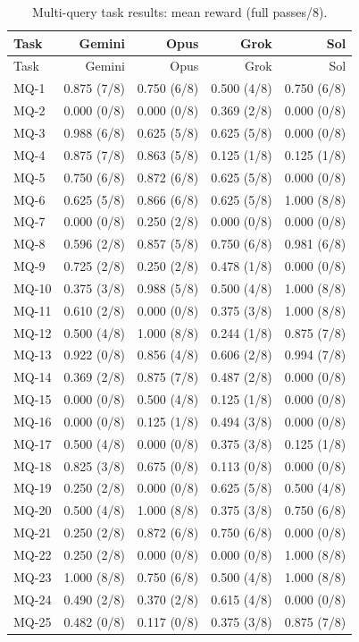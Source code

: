 \documentclass[11pt,letterpaper]{article}
\begin{document}
\clearpage
\begin{longtable}{@{}lrrrr@{}}
\caption{Multi-query task results: mean reward (full passes/8).}\\
\toprule Task & Gemini & Opus & Grok & Sol\\\midrule\endfirsthead
\toprule Task & Gemini & Opus & Grok & Sol\\\midrule\endhead
MQ-1 & 0.875 (7/8) & 0.750 (6/8) & 0.500 (4/8) & 0.750 (6/8)\\
MQ-2 & 0.000 (0/8) & 0.000 (0/8) & 0.369 (2/8) & 0.000 (0/8)\\
MQ-3 & 0.988 (6/8) & 0.625 (5/8) & 0.625 (5/8) & 0.000 (0/8)\\
MQ-4 & 0.875 (7/8) & 0.863 (5/8) & 0.125 (1/8) & 0.125 (1/8)\\
MQ-5 & 0.750 (6/8) & 0.872 (6/8) & 0.625 (5/8) & 0.000 (0/8)\\
MQ-6 & 0.625 (5/8) & 0.866 (6/8) & 0.625 (5/8) & 1.000 (8/8)\\
MQ-7 & 0.000 (0/8) & 0.250 (2/8) & 0.000 (0/8) & 0.000 (0/8)\\
MQ-8 & 0.596 (2/8) & 0.857 (5/8) & 0.750 (6/8) & 0.981 (6/8)\\
MQ-9 & 0.725 (2/8) & 0.250 (2/8) & 0.478 (1/8) & 0.000 (0/8)\\
MQ-10 & 0.375 (3/8) & 0.988 (5/8) & 0.500 (4/8) & 1.000 (8/8)\\
MQ-11 & 0.610 (2/8) & 0.000 (0/8) & 0.375 (3/8) & 1.000 (8/8)\\
MQ-12 & 0.500 (4/8) & 1.000 (8/8) & 0.244 (1/8) & 0.875 (7/8)\\
MQ-13 & 0.922 (0/8) & 0.856 (4/8) & 0.606 (2/8) & 0.994 (7/8)\\
MQ-14 & 0.369 (2/8) & 0.875 (7/8) & 0.487 (2/8) & 0.000 (0/8)\\
MQ-15 & 0.000 (0/8) & 0.500 (4/8) & 0.125 (1/8) & 0.000 (0/8)\\
MQ-16 & 0.000 (0/8) & 0.125 (1/8) & 0.494 (3/8) & 0.000 (0/8)\\
MQ-17 & 0.500 (4/8) & 0.000 (0/8) & 0.375 (3/8) & 0.125 (1/8)\\
MQ-18 & 0.825 (3/8) & 0.675 (0/8) & 0.113 (0/8) & 0.000 (0/8)\\
MQ-19 & 0.250 (2/8) & 0.000 (0/8) & 0.625 (5/8) & 0.500 (4/8)\\
MQ-20 & 0.500 (4/8) & 1.000 (8/8) & 0.375 (3/8) & 0.750 (6/8)\\
MQ-21 & 0.250 (2/8) & 0.872 (6/8) & 0.750 (6/8) & 0.000 (0/8)\\
MQ-22 & 0.250 (2/8) & 0.000 (0/8) & 0.000 (0/8) & 1.000 (8/8)\\
MQ-23 & 1.000 (8/8) & 0.750 (6/8) & 0.500 (4/8) & 1.000 (8/8)\\
MQ-24 & 0.490 (2/8) & 0.370 (2/8) & 0.615 (4/8) & 0.000 (0/8)\\
MQ-25 & 0.482 (0/8) & 0.117 (0/8) & 0.375 (3/8) & 0.875 (7/8)\\
\bottomrule\end{longtable}
\end{document}

